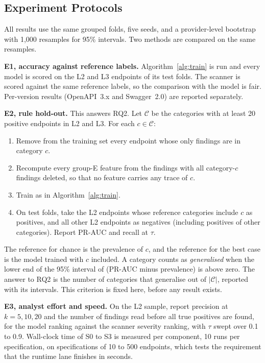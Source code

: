 \documentclass[conference]{IEEEtran}
\begin{document}
\subsection{Experiment Protocols}
All results use the same grouped folds, five seeds, and a provider-level bootstrap with 1{,}000
resamples for 95\% intervals. Two methods are compared on the same resamples.

\textbf{E1, accuracy against reference labels.} Algorithm~\ref{alg:train} is run and every model
is scored on the L2 and L3 endpoints of its test folds. The scanner is scored against the
same reference labels, so the comparison with the model is fair. Per-version results (OpenAPI~3.x
and Swagger~2.0) are reported separately.

\textbf{E2, rule hold-out.} This answers RQ2. Let $\mathcal{C}$ be the categories with at
least 20 positive endpoints in L2 and L3. For each $c\in\mathcal{C}$:
\begin{enumerate}
\item Remove from the training set every endpoint whose only findings are in category $c$.
\item Recompute every group-E feature from the findings with all category-$c$ findings
deleted, so that no feature carries any trace of $c$.
\item Train as in Algorithm~\ref{alg:train}.
\item On test folds, take the L2 endpoints whose reference categories include $c$ as
positives, and all other L2 endpoints as negatives (including positives of other categories). Report PR-AUC and recall at $\tau$.
\end{enumerate}
The reference for chance is the prevalence of $c$, and the reference for the best case is the
model trained with $c$ included. A category counts as \emph{generalised} when the lower end of
the 95\% interval of (PR-AUC minus prevalence) is above zero. The answer to RQ2 is the number
of categories that generalise out of $|\mathcal{C}|$, reported with its intervals. This
criterion is fixed here, before any result exists.

\textbf{E3, analyst effort and speed.} On the L2 sample, report precision at $k=5,10,20$ and the
number of findings read before all true positives are found, for the model ranking against the
scanner severity ranking, with $\tau$ swept over 0.1 to 0.9. Wall-clock time of S0 to S3 is
measured per component, 10 runs per specification, on specifications of 10 to 500 endpoints,
which tests the requirement that the runtime lane finishes in seconds.
\end{document}
